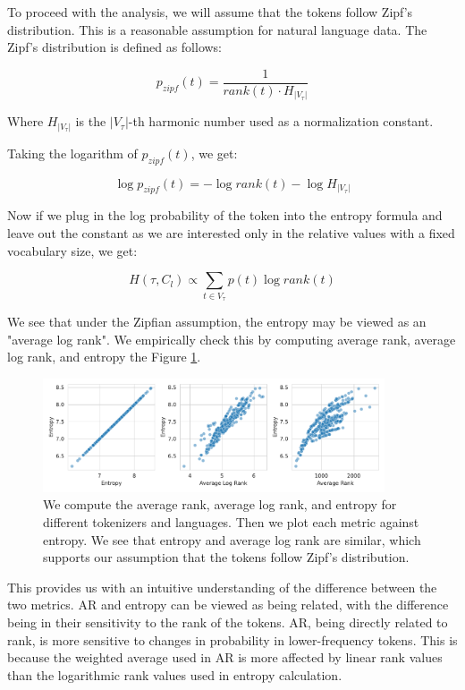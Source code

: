 To proceed with the analysis, we will assume that the tokens follow Zipf's distribution. This is a reasonable assumption for natural language data. The Zipf's distribution is defined as follows:

\begin{equation}
    p_{zipf}(t) = \frac{1}{rank(t) \cdot H_{|V_\tau|}}
\end{equation}

Where $H_{|V_\tau|}$ is the $|V_\tau|$-th harmonic number used as a normalization constant.

Taking the logarithm of $p_{zipf}(t)$, we get:

\begin{equation}
    \log p_{zipf}(t) = - \log rank(t) - \log H_{|V_\tau|}
\end{equation}

Now if we plug in the log probability of the token into the entropy formula and leave out the constant as we are interested only in the relative values with a fixed vocabulary size, we get:

\begin{equation}
    H(\tau, C_l) \propto \sum_{t \in V_\tau} p(t) \log rank(t)
\end{equation}

We see that under the Zipfian assumption, the entropy may be viewed as an "average log rank". We empirically check this by computing average rank, average log rank, and entropy the Figure \ref{fig:ar_alr_entropy}.

\begin{figure}
    \centering
    \includegraphics[width=0.9\textwidth]{figures/ar_alr_entropy.pdf}
    \caption{We compute the average rank, average log rank, and entropy for different tokenizers and languages. Then we plot each metric against entropy. We see that entropy and average log rank are similar, which supports our assumption that the tokens follow Zipf's distribution.}
    \label{fig:ar_alr_entropy}
\end{figure}

This provides us with an intuitive understanding of the difference between the two metrics. AR and entropy can be viewed as being related, with the difference being in their sensitivity to the rank of the tokens. AR, being directly related to rank, is more sensitive to changes in probability in lower-frequency tokens. This is because the weighted average used in AR is more affected by linear rank values than the logarithmic rank values used in entropy calculation.

